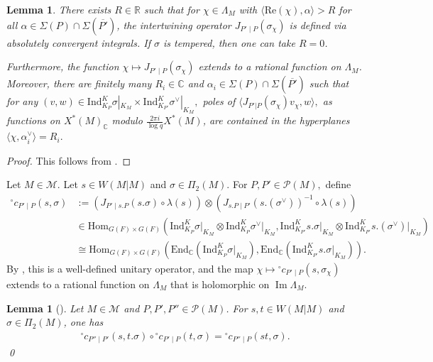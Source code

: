 \documentclass[10pt]{amsart}
\newtheorem{lemma}[theorem]{Lemma}
\theoremstyle{definition}
\numberwithin{equation}{section}
\numberwithin{equation}{subsection}
\newcommand{\Ind}{\mathrm{Ind}}
\newcommand{\RR}{\mathbb{R}}
\newcommand{\CC}{\mathbb{C}}
\renewcommand{\Im}{\mathop{\mathrm{Im}}}
\begin{document}
\begin{lemma}\label{lem:J} There exists $R\in\RR$ such that for $\chi\in\Lambda_M$ with $\langle\mathrm{Re}(\chi),\alpha\rangle>R$ for all $\alpha\in\Sigma(P)\cap\Sigma(\overline{P'})$, the intertwining operator $J_{P'\mid P}(\sigma_\chi)$ is defined via absolutely convergent integrals. If $\sigma$ is tempered, then one can take $R=0$.

Furthermore, the function $\chi\mapsto J_{P'\mid P}(\sigma_\chi)$ extends to a rational function on $\Lambda_M$. Moreover, there are finitely many $R_i\in \CC$ and $\alpha_i\in \Sigma(P)\cap \Sigma(\overline{P'})$ such that for any $(v,w)\in \Ind_{K_P}^K\sigma|_{K_M}\times \Ind_{K_{P'}}^K\sigma^\lor|_{K_M},$ poles of $\langle J_{P'|P}(\sigma_\chi)v_\chi,w\rangle,$ as functions on $X^\ast(M)_\CC$ modulo $\tfrac{2\pi i}{\log q}X^\ast(M)$, are contained in the hyperplanes $\langle \chi,\alpha_i^\lor\rangle=R_i.$
\end{lemma}
\begin{proof} 
This follows from \cite[Th\'eor\`eme IV.1.1 and Proposition IV.2.1]{Waldspurger:Plancherel}.     
\end{proof}


Let $M\in \mathcal{M}.$ Let $s\in W(M|M)$ and $\sigma\in\Pi_2(M)$. For $P,P'\in \mathcal{P}(M),$ define 
\begin{align*}
    {}^\circ c_{P'\mid P}(s,\sigma) &:= (J_{P'\mid s.P}(s.\sigma)\circ \lambda(s))\otimes (J_{s.P\mid P'}(s.(\sigma^\vee))^{-1}\circ \lambda(s))\\
    &\in \mathrm{Hom}_{G(F)\times G(F)} \left(\Ind_{K_P}^K\sigma\vert_{K_M}\otimes  \Ind_{K_P}^K \sigma^\lor|_{K_M},\Ind_{K_{P'}}^Ks.\sigma\vert_{K_{M}}\otimes\Ind_{K_{P'}}^Ks.(\sigma^\lor)\vert_{K_{M}}\right)\\
    &\cong  \mathrm{Hom}_{G(F)\times G(F)} \left(\mathrm{End}_\CC(\Ind_{K_P}^K\sigma\vert_{K_M}),\mathrm{End}_\CC(\Ind_{K_{P'}}^Ks.\sigma\vert_{K_{M}})\right).
\end{align*}
By \cite[Lemme V.3.1]{Waldspurger:Plancherel}, this is a well-defined unitary operator, and the map $\chi\mapsto {}^\circ c_{P'\mid P}(s,\sigma_\chi)$ extends to a rational function on $\Lambda_M$ that is holomorphic on $\Im\Lambda_M$. 

\begin{lemma}[{\cite[Lemme V.3.2]{Waldspurger:Plancherel}}]\label{oc:cocycle} Let $M\in \mathcal{M}$ and $P,P',P''\in \mathcal{P}(M)$. For $s,t\in W(M|M)$ and $\sigma\in \Pi_2(M)$, one has
\begin{align*}
    ^\circ c_{P''\mid P'}(s,t.\sigma)\circ{}^\circ c_{P'\mid P}(t,\sigma) = {}^\circ c_{P''\mid P}(st,\sigma).
\end{align*}\qed
\end{lemma}
\end{document}
